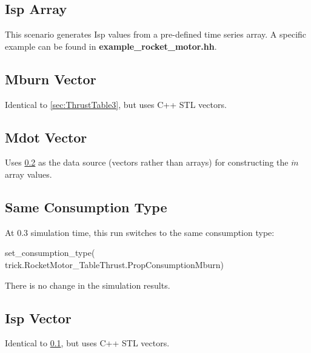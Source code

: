 \documentclass[11pt,fleqn]{report}
\begin{document}
\subsection{Isp Array}\label{sec:ThrustTable1}
This scenario generates Isp values from a pre-defined time series array.  A specific example can be found in \textbf{example\_rocket\_motor.hh}.

\subsection{Mburn Vector}\label{sec:ThrustTable4}
Identical to \ref{sec:ThrustTable3}, but uses C++ STL vectors.

\subsection{Mdot Vector}\label{sec:ThrustTable6}
Uses \ref{sec:ThrustTable4} as the data source (vectors rather than arrays) for constructing the $\mathring{m}$ array values.

\subsection{Same Consumption Type}\label{sec:ThrustTable7}
At 0.3 simulation time, this run switches to the same consumption type:
\begin{code}
set_consumption_type(
        trick.RocketMotor_TableThrust.PropConsumptionMburn)
\end{code}

There is no change in the simulation results.

\subsection{Isp Vector}\label{sec:ThrustTable2}
Identical to \ref{sec:ThrustTable1}, but uses C++ STL vectors.
\end{document}
